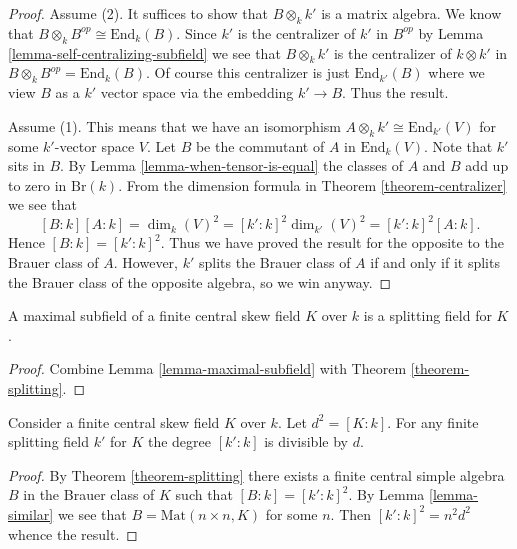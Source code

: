 \begin{proof}
Assume (2). It suffices to show that $B \otimes_k k'$ is a matrix
algebra. We know that $B \otimes_k B^{op} \cong \text{End}_k(B)$.
Since $k'$ is the centralizer of $k'$ in $B^{op}$ by
Lemma \ref{lemma-self-centralizing-subfield}
we see that $B \otimes_k k'$ is the centralizer of $k \otimes k'$
in $B \otimes_k B^{op} = \text{End}_k(B)$. Of course this centralizer
is just $\text{End}_{k'}(B)$ where we view $B$ as a $k'$ vector space
via the embedding $k' \to B$. Thus the result.

\medskip\noindent
Assume (1). This means that we have an isomorphism
$A \otimes_k k' \cong \text{End}_{k'}(V)$ for some $k'$-vector space $V$.
Let $B$ be the commutant of $A$ in $\text{End}_k(V)$. Note that
$k'$ sits in $B$. By
Lemma \ref{lemma-when-tensor-is-equal}
the classes of $A$ and $B$ add up to zero in $\text{Br}(k)$.
From the dimension formula in
Theorem \ref{theorem-centralizer}
we see that
$$
[B : k] [A : k] =
\dim_k(V)^2 =
[k' : k]^2 \dim_{k'}(V)^2 =
[k' : k]^2 [A : k].
$$
Hence $[B : k] = [k' : k]^2$. Thus we have proved the result for the
opposite to the Brauer class of $A$. However, $k'$ splits the Brauer
class of $A$ if and only if it splits
the Brauer class of the opposite algebra, so we win anyway.
\end{proof}

\begin{lemma}
\label{lemma-maximal-subfield-splits}
A maximal subfield of a finite central skew field $K$ over $k$ is
a splitting field for $K$.
\end{lemma}

\begin{proof}
Combine Lemma \ref{lemma-maximal-subfield} with
Theorem \ref{theorem-splitting}.
\end{proof}

\begin{lemma}
\label{lemma-splitting-field-degree}
Consider a finite central skew field $K$ over $k$. Let $d^2 = [K : k]$.
For any finite splitting field $k'$ for $K$ the degree $[k' : k]$ is
divisible by $d$.
\end{lemma}

\begin{proof}
By Theorem \ref{theorem-splitting} there exists a finite central
simple algebra $B$ in the Brauer class of $K$ such that
$[B : k] = [k' : k]^2$. By
Lemma \ref{lemma-similar}
we see that $B = \text{Mat}(n \times n, K)$ for some $n$.
Then $[k' : k]^2 = n^2d^2$ whence the result.
\end{proof}

